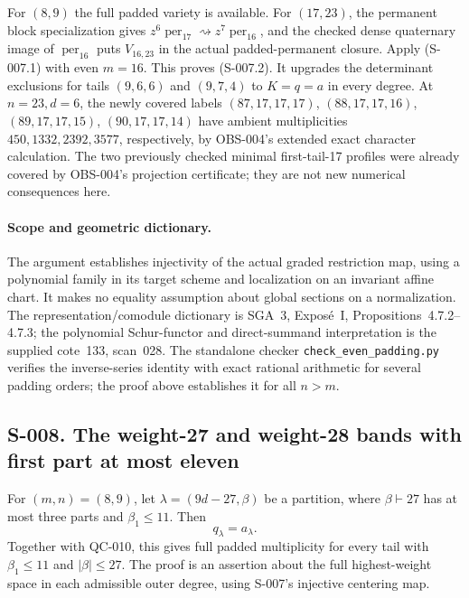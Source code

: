 For $(8,9)$ the full padded variety is available.  For $(17,23)$,
the permanent block specialization gives
$z^6\operatorname{per}_{17}\rightsquigarrow z^7\operatorname{per}_{16}$,
and the checked dense quaternary image of $\operatorname{per}_{16}$
puts $V_{16,23}$ in the actual padded-permanent closure.  Apply
(S-007.1) with even $m=16$.  This proves (S-007.2).
It upgrades the determinant exclusions for tails $(9,6,6)$ and
$(9,7,4)$ to $K=q=a$ in every degree.  At $n=23,d=6$, the newly
covered labels $(87,17,17,17)$, $(88,17,17,16)$,
$(89,17,17,15)$, $(90,17,17,14)$ have ambient multiplicities
$450,1332,2392,3577$, respectively, by OBS-004's extended exact
character calculation.  The two previously checked minimal
first-tail-17 profiles were already covered by OBS-004's projection
certificate; they are not new numerical consequences here.

\paragraph{Scope and geometric dictionary.}
The argument establishes injectivity of the actual graded restriction
map, using a polynomial family in its target scheme and localization
on an invariant affine chart.  It makes no equality assumption about
global sections on a normalization.  The representation/comodule
dictionary is SGA~3, Expos\'e~I, Propositions~4.7.2--4.7.3; the
polynomial Schur-functor and direct-summand interpretation is the
supplied cote~133, scan~028.  The standalone checker
\texttt{check\_even\_padding.py} verifies the inverse-series identity
with exact rational arithmetic for several padding orders; the proof
above establishes it for all $n>m$.

\subsection{S-008. The weight-27 and weight-28 bands with first part at most eleven}
For $(m,n)=(8,9)$, let $\lambda=(9d-27,\beta)$ be a partition,
where $\beta\vdash27$ has at most three parts and $\beta_1\leq11$.
Then
\[
                              q_\lambda=a_\lambda.            \tag{S-008.1}
\]
Together with QC-010, this gives full padded multiplicity for every
tail with $\beta_1\leq11$ and $|\beta|\leq27$.
The proof is an assertion about the full highest-weight space in each
admissible outer degree, using S-007's injective centering map.

